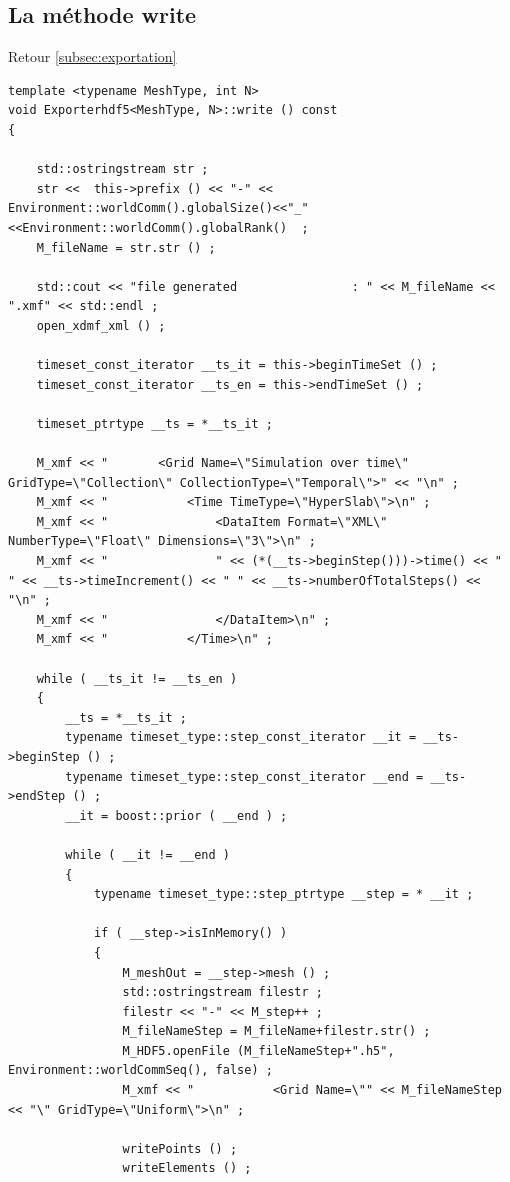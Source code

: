 \documentclass[12pt]{article}
\begin{document}
\subsection {La méthode write}
\label{subsec:write}
Retour \ref{subsec:exportation}
\begin{lstlisting}
template <typename MeshType, int N>
void Exporterhdf5<MeshType, N>::write () const 
{

    std::ostringstream str ;
    str <<  this->prefix () << "-" << Environment::worldComm().globalSize()<<"_"<<Environment::worldComm().globalRank()  ;
    M_fileName = str.str () ; 

    std::cout << "file generated                : " << M_fileName << ".xmf" << std::endl ;
    open_xdmf_xml () ;

    timeset_const_iterator __ts_it = this->beginTimeSet () ;
    timeset_const_iterator __ts_en = this->endTimeSet () ;

    timeset_ptrtype __ts = *__ts_it ;

    M_xmf << "       <Grid Name=\"Simulation over time\" GridType=\"Collection\" CollectionType=\"Temporal\">" << "\n" ;
    M_xmf << "           <Time TimeType=\"HyperSlab\">\n" ;
    M_xmf << "               <DataItem Format=\"XML\" NumberType=\"Float\" Dimensions=\"3\">\n" ;
    M_xmf << "               " << (*(__ts->beginStep()))->time() << " " << __ts->timeIncrement() << " " << __ts->numberOfTotalSteps() << "\n" ;
    M_xmf << "               </DataItem>\n" ;
    M_xmf << "           </Time>\n" ;

    while ( __ts_it != __ts_en )
    {
        __ts = *__ts_it ;
        typename timeset_type::step_const_iterator __it = __ts->beginStep () ;
        typename timeset_type::step_const_iterator __end = __ts->endStep () ;
        __it = boost::prior ( __end ) ;

        while ( __it != __end )
        {
            typename timeset_type::step_ptrtype __step = * __it ;

            if ( __step->isInMemory() )
            {
                M_meshOut = __step->mesh () ;
                std::ostringstream filestr ;
                filestr << "-" << M_step++ ;
                M_fileNameStep = M_fileName+filestr.str() ;
                M_HDF5.openFile (M_fileNameStep+".h5", Environment::worldCommSeq(), false) ;
                M_xmf << "           <Grid Name=\"" << M_fileNameStep << "\" GridType=\"Uniform\">\n" ;

                writePoints () ;
                writeElements () ;


\end{lstlisting}
\end{document}

